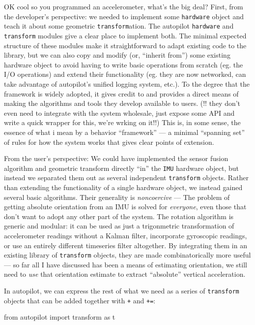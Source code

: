 \documentclass[10pt]{article}
\newenvironment{Shaded}{}{}
\newcommand{\ImportTok}[1]{#1}
\newcommand{\NormalTok}[1]{#1}
\begin{document}
\begin{multicols}{2}
OK cool so you programmed an accelerometer, what's the big deal? First,
from the developer's perspective: we needed to implement some
\texttt{hardware} object and teach it about some geometric
\texttt{transform}ation. The autopilot \texttt{hardware} and
\texttt{transform} modules give a clear place to implement both. The
minimal expected structure of these modules make it straightforward to
adapt existing code to the library, but we can also copy and modify (or,
``inherit from'') some existing hardware object to avoid having to write
basic operations from scratch (eg. the I/O operations) and extend their
functionality (eg. they are now networked, can take advantage of
autopilot's unified logging system, etc.). To the degree that the
framework is widely adopted, it gives credit to and provides a direct
means of making the algorithms and tools they develop available to
users. (!! they don't even need to integrate with the system wholesale,
just expose some API and write a quick wrapper for this, we're wrking on
it!!) This is, in some sense, the essence of what i mean by a behavior
``framework'' --- a minimal ``spanning set'' of rules for how the system
works that gives clear points of extension.

From the user's perspective: We could have implemented the sensor fusion
algorithm and geometric transform directly ``in'' the \texttt{IMU}
hardware object, but instead we separated them out as several
independent \texttt{transform} objects. Rather than extending the
functionality of a single hardware object, we instead gained several
basic algorithms. Their generality is \emph{noncoercive} --- The problem
of getting absolute orientation from an IMU is solved for
\emph{everyone}, even those that don't want to adopt any other part of
the system. The rotation algorithm is generic and modular: it can be
used as just a trigonmetric transformation of accelerometer readings
without a Kalman filter, incorporate gyroscopic readings, or use an
entirely different timeseries filter altogether. By integrating them in
an existing library of \texttt{transform} objects, they are made
combinatorically more useful --- so far all I have discussed has been a
means of estimating orientation, we still need to \emph{use} that
orientation estimate to extract ``absolute'' vertical acceleration.

In autopilot, we can express the rest of what we need as a series of
\texttt{transform} objects that can be added together with \texttt{+}
and \texttt{+=}:

\begin{Shaded}
\begin{Highlighting}[]
\ImportTok{from}\NormalTok{ autopilot }\ImportTok{import}\NormalTok{ transform }\ImportTok{as}\NormalTok{ t}


\end{Highlighting}
\end{Shaded}
\end{multicols}
\end{document}
